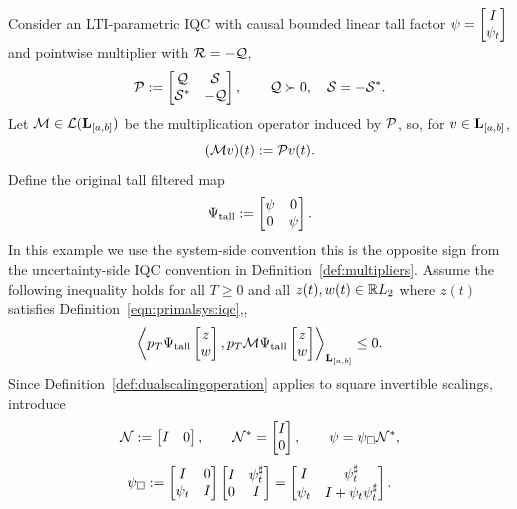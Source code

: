 \begin{example}
    Consider an LTI-parametric IQC with causal bounded linear tall factor
    $\psi=\begin{bmatrix}I\\\psi_t\end{bmatrix}$ and pointwise multiplier with $\mathcal{R}=-\mathcal{Q}$,
    \begin{equation}
        \mathcal{P}:=
        \begin{bmatrix}\mathcal{Q} & \mathcal{S}\\ \mathcal{S}^* & -\mathcal{Q}\end{bmatrix},
        \qquad
        \mathcal{Q}\succ0,\quad
        \mathcal{S}=-\mathcal{S}^* .
    \end{equation}
    Let $\mathcal{M}\in\mathcal{L}(\mathbf{L}_{[a,b]})$ be the multiplication operator
    induced by $\mathcal{P}$, so, for $v\in\mathbf{L}_{[a,b]}$,
    \begin{equation}
        (\mathcal{M}v)(t):=\mathcal{P}v(t).
    \end{equation}
    Define the original tall filtered map
    \begin{equation}
        \Psi_{\mathrm{tall}}
        :=
        \begin{bmatrix}\psi & 0\\0 & \psi\end{bmatrix}.
    \end{equation}
    In this example we use the system-side convention this is the
    opposite sign from the uncertainty-side IQC convention in
    Definition~\ref{def:multipliers}. Assume the following inequality holds
    for all $T\geq0$ and all $z(t),w(t)\in\mathbb{R} L_2$ where ${z}(t)$ satisfies Definition~\ref{eqn:primalsys:iqc},,
    \begin{equation}
        \left\langle 
            p_T\Psi_{\mathrm{tall}}\begin{bmatrix}z\\w\end{bmatrix}
        , 
            p_T\mathcal{M}\Psi_{\mathrm{tall}}\begin{bmatrix}z\\w\end{bmatrix}
         \right\rangle_{\mathbf{L}_{[a,b]}}
        \leq 0.
    \end{equation}
    Since Definition~\ref{def:dualscalingoperation} applies to square
    invertible scalings, introduce
    \begin{equation}
        \mathcal{N}:=\begin{bmatrix}I&0\end{bmatrix},
        \qquad
        \mathcal{N}^*=\begin{bmatrix}I\\0\end{bmatrix},
        \qquad
        \psi=\psi_\square\mathcal{N}^*,
    \end{equation}
    \begin{equation}
        \psi_\square
        :=
        \bmat{I & 0 \\ \psi_t & I}
        \bmat{I & \psi_t^\dual\\ 0 & I}
        =
        \bmat{I & \psi_t^\dual \\
              \psi_t & I+\psi_t\psi_t^\dual}.

\end{equation}
\end{example}

